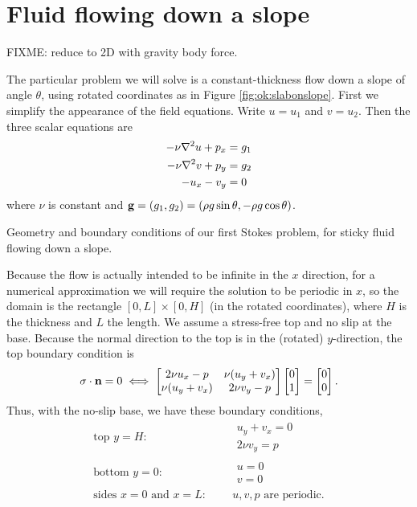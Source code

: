 \section{Fluid flowing down a slope}

FIXME: reduce to 2D with gravity body force.

The particular problem we will solve is a constant-thickness flow down a slope of angle $\theta$, using rotated coordinates as in Figure \ref{fig:ok:slabonslope}.  First we simplify the appearance of the field equations.  Write $u=u_1$ and $v=u_2$.  Then the three scalar equations are
\begin{align}
-\nu \nabla^2 u + p_x &= g_1 \label{eq:ok:stokes2du} \\
-\nu \nabla^2 v + p_y &= g_2 \label{eq:ok:stokes2dv} \\
- u_x - v_y &= 0 \label{eq:ok:stokes2dincomp}
\end{align}
where $\nu$ is constant and $\mathbf{g} = (g_1,g_2) = (\rho g \sin \theta, - \rho g \cos \theta)$.

\begin{marginfigure}

\caption{Geometry and boundary conditions of our first Stokes problem, for sticky fluid flowing down a slope.}
\label{fig:ok:slabonslope}
\end{marginfigure}

Because the flow is actually intended to be infinite in the $x$ direction, for a numerical approximation we will require the solution to be periodic in $x$, so the domain is the rectangle $[0,L]\times[0,H]$ (in the rotated coordinates), where $H$ is the thickness and $L$ the length.  We assume a stress-free top and no slip at the base.  Because the normal direction to the top is in the (rotated) $y$-direction, the top boundary condition is
  $$\sigma\cdot\mathbf{n} = 0 \iff
\begin{bmatrix}
2 \nu u_x - p & \nu (u_y+v_x) \\
\nu (u_y+v_x) & 2 \nu v_y - p
\end{bmatrix} \begin{bmatrix}
0 \\ 1
\end{bmatrix} = \begin{bmatrix}
0 \\ 0
\end{bmatrix}.$$
Thus, with the no-slip base, we have these boundary conditions,
\begin{align}
\text{top $y=H$:}&    & &\begin{array}{l} u_y + v_x = 0 \\ 2 \nu v_y = p\end{array}  \label{eq:ok:bcstokestop} \\
\text{bottom $y=0$:}& & &\begin{array}{l} u = 0 \\ v = 0 \end{array} \label{eq:ok:bcstokesbottom} \\
\text{sides $x=0$ and $x=L$:}&
                      & &u,v,p \text{ are periodic}. \label{eq:ok:bcstokesperiodic}
\end{align}


